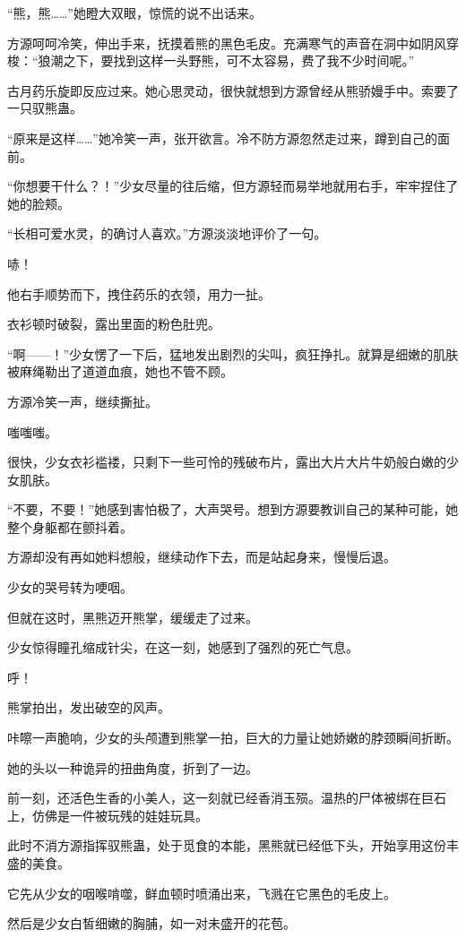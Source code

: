 \begin{this_body}
“熊，熊……”她瞪大双眼，惊慌的说不出话来。

方源呵呵冷笑，伸出手来，抚摸着熊的黑色毛皮。充满寒气的声音在洞中如阴风穿梭：“狼潮之下，要找到这样一头野熊，可不太容易，费了我不少时间呢。”

古月药乐旋即反应过来。她心思灵动，很快就想到方源曾经从熊骄嫚手中。索要了一只驭熊蛊。

“原来是这样……”她冷笑一声，张开欲言。冷不防方源忽然走过来，蹲到自己的面前。

“你想要干什么？！”少女尽量的往后缩，但方源轻而易举地就用右手，牢牢捏住了她的脸颊。

“长相可爱水灵，的确讨人喜欢。”方源淡淡地评价了一句。

哧！

他右手顺势而下，拽住药乐的衣领，用力一扯。

衣衫顿时破裂，露出里面的粉色肚兜。

“啊——！”少女愣了一下后，猛地发出剧烈的尖叫，疯狂挣扎。就算是细嫩的肌肤被麻绳勒出了道道血痕，她也不管不顾。

方源冷笑一声，继续撕扯。

嗤嗤嗤。

很快，少女衣衫褴褛，只剩下一些可怜的残破布片，露出大片大片牛奶般白嫩的少女肌肤。

“不要，不要！”她感到害怕极了，大声哭号。想到方源要教训自己的某种可能，她整个身躯都在颤抖着。

方源却没有再如她料想般，继续动作下去，而是站起身来，慢慢后退。

少女的哭号转为哽咽。

但就在这时，黑熊迈开熊掌，缓缓走了过来。

少女惊得瞳孔缩成针尖，在这一刻，她感到了强烈的死亡气息。

呼！

熊掌拍出，发出破空的风声。

咔嚓一声脆响，少女的头颅遭到熊掌一拍，巨大的力量让她娇嫩的脖颈瞬间折断。

她的头以一种诡异的扭曲角度，折到了一边。

前一刻，还活色生香的小美人，这一刻就已经香消玉殒。温热的尸体被绑在巨石上，仿佛是一件被玩残的娃娃玩具。

此时不消方源指挥驭熊蛊，处于觅食的本能，黑熊就已经低下头，开始享用这份丰盛的美食。

它先从少女的咽喉啃噬，鲜血顿时喷涌出来，飞溅在它黑色的毛皮上。

然后是少女白皙细嫩的胸脯，如一对未盛开的花苞。


\end{this_body}
